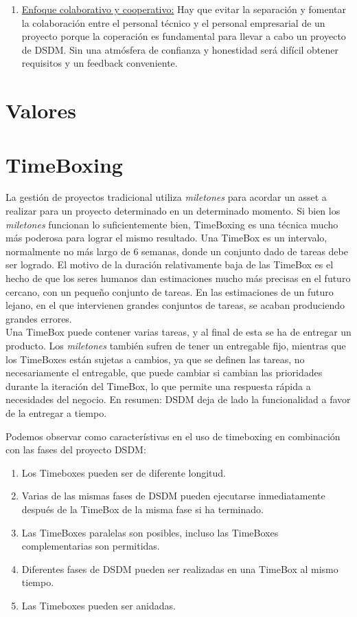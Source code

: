 \documentclass[12pt,a4paper]{article}
\begin{document}
\begin{enumerate}
\item \underline{Enfoque colaborativo y cooperativo:} Hay que evitar la separación y fomentar la colaboración entre el personal técnico y el personal empresarial
de un proyecto porque la coperación es fundamental para llevar a cabo un proyecto de DSDM. Sin una atmósfera de confianza y honestidad será difícil obtener requisitos y un feedback conveniente.
\end{enumerate}


\section{Valores}

\section{TimeBoxing}
La gestión de proyectos tradicional utiliza \emph{miletones} para acordar un asset a realizar para un proyecto determinado en un determinado momento. Si bien los \emph{miletones} funcionan lo suficientemente bien, TimeBoxing es una técnica mucho más poderosa para lograr el mismo resultado. Una TimeBox es un intervalo, normalmente no más largo de 6 semanas, donde un conjunto dado de tareas debe ser logrado. El motivo de la duración relativamente baja de las TimeBox es el hecho de que los seres humanos dan estimaciones mucho más precisas en el futuro cercano, con un pequeño conjunto de tareas.
En las estimaciones de un futuro lejano, en el que intervienen grandes conjuntos de tareas, se acaban produciendo grandes errores.\\

 Una TimeBox puede contener varias tareas, y al final de esta se ha de entregar un producto. Los \emph{miletones} también
sufren de tener un entregable fijo, mientras que los TimeBoxes están sujetas a cambios, ya que se definen las tareas, no necesariamente el entregable, que puede cambiar si cambian las prioridades durante la iteración del TimeBox, lo que permite una respuesta rápida a necesidades del negocio. En resumen: DSDM deja de lado la funcionalidad a favor de la entregar a tiempo. 

Podemos observar como característivas en el uso de timeboxing en combinación con las fases del proyecto DSDM:
\begin{enumerate}
	\item  Los Timeboxes pueden ser de diferente longitud.
	\item  Varias de las mismas fases de DSDM pueden ejecutarse inmediatamente después de la TimeBox de la misma fase si ha terminado.
\item Las TimeBoxes paralelas son posibles, incluso las TimeBoxes complementarias son permitidas.
\item Diferentes fases de DSDM pueden ser realizadas en una TimeBox al mismo tiempo.
\item Las Timeboxes pueden ser anidadas.
\end{enumerate}
\end{document}
